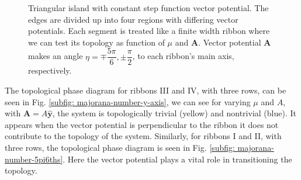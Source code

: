 \documentclass[aps,prb,showpacs,amsmath,amssymb,superscriptaddress]{revtex4-2}
\let\oldhat\hat
\renewcommand{\hat}[1]{\oldhat{\mathbf{#1}}}
\renewcommand{\vec}[1]{\mathbf{#1}}
\begin{document}
\begin{figure}[]
  \caption{Triangular island with constant step function vector potential. The edges are divided up into four regions with differing vector potentials. Each segment is treated like a finite width ribbon where we can test its topology as function of $\mu$ and $\vec{A}$. Vector potential $\vec{A}$ makes an angle $\eta =  \mp \dfrac{5\pi}{6}, \pm \dfrac{\pi}{2}$, to each ribbon's main axis, respectively.}
  \label{fig: triangular-island-vector-potential-divided}
\end{figure}

The topological phase diagram for ribbons III and IV, with three rows, can be seen in Fig. \ref{subfig: majorana-number-y-axis}, we can see for varying $\mu$ and $A$, with $\vec{A} = A\hat{y}$, the system is topologically trivial (yellow) and nontrivial (blue).
It appears when the vector potential is perpendicular to the ribbon it does not contribute to the topology of the system.
Similarly, for ribbons I and II, with three rows, the topological phase diagram is seen in Fig. \ref{subfig: majorana-number-5pi6ths}.
Here the vector potential plays a vital role in transitioning the topology.
\end{document}
